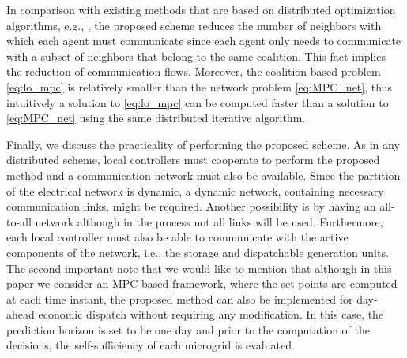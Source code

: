 In comparison with existing methods that are based on distributed optimization algorithms, e.g., \cite{baker2016,wang2015,kraning2014,braun2016,guo2016}, the proposed scheme reduces the number of neighbors with which each agent must communicate since each agent only needs to communicate with a subset of neighbors that belong to the same coalition. This fact implies the reduction of communication flows. Moreover, the coalition-based problem \eqref{eq:lo_mpc} is relatively smaller than the network problem \eqref{eq:MPC_net}, thus intuitively a solution to \eqref{eq:lo_mpc} can be computed faster than a solution to \eqref{eq:MPC_net} using the same distributed iterative algorithm. 

Finally, we discuss the practicality of performing the proposed scheme. As in any distributed scheme, local controllers must cooperate to perform the proposed method and a communication network must also be available. Since the partition of the electrical network is dynamic, a dynamic network, containing necessary communication links, might be required. Another possibility is by having an all-to-all network although in the process not all links will be used. Furthermore, each local controller must also be able to communicate with the active components of the network, i.e., the storage and dispatchable generation units. The second important note that we would like to mention that although in this paper we consider an MPC-based framework, where the set points are computed at each time instant, the proposed method can also be implemented for day-ahead economic dispatch without requiring any modification. In this case, the prediction horizon is set to be one day and prior to the computation of the decisions, the self-sufficiency of each microgrid is evaluated. \color{black}